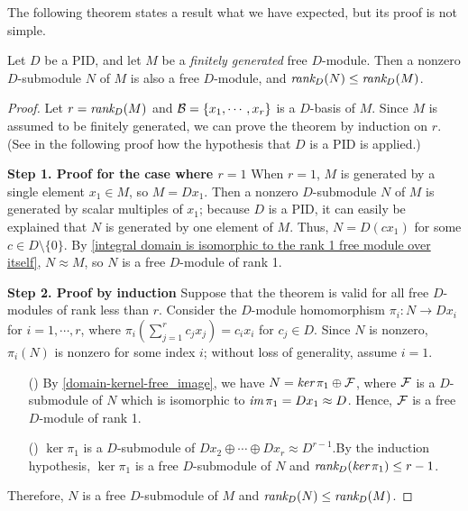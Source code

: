 The following theorem states a result what we have expected, but its proof is not simple.
\begin{thm}\label{submodules of a finite-rank free module over a pid are free}
    Let $D$ be a PID, and let $M$ be a \textit{finitely generated} free $D$-module.
    Then a nonzero $D$-submodule $N$ of $M$ is also a free $D$-module, and $\textit{rank}_D(N)\leq\textit{rank}_D(M)$.
\end{thm}
\begin{proof}
    Let $r=\textit{rank}_D(M)$ and ${\mathcal{B}}=\{x_1, \cdots, x_r\}$ is a $D$-basis of $M$.
    Since $M$ is assumed to be finitely generated, we can prove the theorem by induction on $r$. (See in the following proof how the hypothesis that $D$ is a PID is applied.)

    \textbf{Step 1. Proof for the case where $r=1$}\newline\noindent
    When $r=1$, $M$ is generated by a single element $x_1\in M$, so $M=Dx_1$.
    Then a nonzero $D$-submodule $N$ of $M$ is generated by scalar multiples of $x_1$; because $D$ is a PID, it can easily be explained that $N$ is generated by one element of $M$.
    Thus, $N=D(cx_1)$ for some $c\in D\setminus\{0\}$.
    By \cref{integral domain is isomorphic to the rank 1 free module over itself}, $N\approx M$, so $N$ is a free $D$-module of rank 1.

    \textbf{Step 2. Proof by induction}\newline\noindent
    Suppose that the theorem is valid for all free $D$-modules of rank less than $r$.
    Consider the $D$-module homomorphism $\pi_i: N\rightarrow Dx_i$ for $i=1, \cdots, r$, where $\pi_i(\sum_{j=1}^r c_jx_j)=c_ix_i$ for $c_j\in D$.
    Since $N$ is nonzero, $\pi_i(N)$ is nonzero for some index $i$; without loss of generality, assume $i=1$.
    \begin{enumerate}
        \item[(\romannumeral 1)]
        {
            By \cref{domain-kernel-free_image}, we have $N=\textit{ker\,}\pi_1\oplus{\mathcal{F}}$, where ${\mathcal{F}}$ is a $D$-submodule of $N$ which is isomorphic to $\textit{im\,}\pi_1=Dx_1\approx D$.
            Hence, ${\mathcal{F}}$ is a free $D$-module of rank 1.
        }
        \item[(\romannumeral 2)]
        {
            $\ker\pi_1$ is a $D$-submodule of $Dx_2\oplus\cdots\oplus Dx_r\approx D^{r-1}$.By the induction hypothesis, $\ker\pi_1$ is a free $D$-submodule of $N$ and $\textit{rank}_D(\textit{ker\,}\pi_1)\leq r-1$.
        }
    \end{enumerate}
    Therefore, $N$ is a free $D$-submodule of $M$ and $\textit{rank}_D(N)\leq\textit{rank}_D(M)$.
\end{proof}
